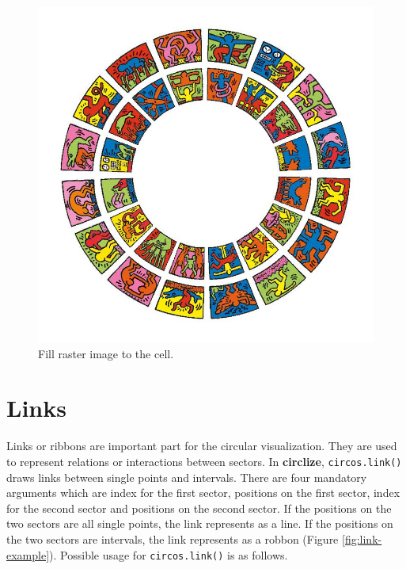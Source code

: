 \documentclass[]{book}
\theoremstyle{definition}
\theoremstyle{definition}
\theoremstyle{remark}
\begin{document}
\begin{figure}

{\centering \includegraphics[width=11.11in]{images/doodle} 

}

\caption{Fill raster image to the cell.}\label{fig:raster-doodle}
\end{figure}

\section{Links}\label{links}

Links or ribbons are important part for the circular visualization. They
are used to represent relations or interactions between sectors. In
\textbf{circlize}, \texttt{circos.link()} draws links between single
points and intervals. There are four mandatory arguments which are index
for the first sector, positions on the first sector, index for the
second sector and positions on the second sector. If the positions on
the two sectors are all single points, the link represents as a line. If
the positions on the two sectors are intervals, the link represents as a
robbon (Figure \ref{fig:link-example}). Possible usage for
\texttt{circos.link()} is as follows.
\end{document}
